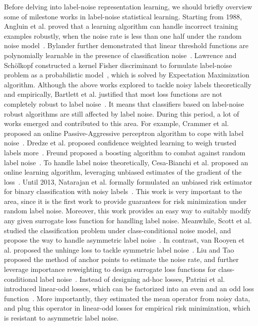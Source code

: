 Before delving into label-noise representation learning, we should briefly overview some of milestone works in label-noise statistical learning. Starting from 1988, Angluin et al. proved that a learning algorithm can handle incorrect training examples robustly, when the noise rate is less than one half under the random noise model~. Bylander further demonstrated that linear threshold functions are polynomially learnable in the presence of classification noise~. Lawrence and Sch\"olkopf constructed a kernel Fisher discriminant to formulate label-noise problem as a probabilistic model~, which is solved by Expectation Maximization algorithm. Although the above works explored to tackle noisy labels theoretically and empirically, Bartlett et al. justified that most loss functions are not completely robust to label noise~. It means that classifiers based on label-noise robust algorithms are still affected by label noise.
During this period, a lot of works emerged and contributed to this area. For example, Crammer et al. proposed an online Passive-Aggressive perceptron algorithm to cope with label noise~. Dredze et al. proposed confidence weighted learning to weigh trusted labels more~. Freund proposed a boosting algorithm to combat against random label noise~. To handle label noise theoretically, Cesa-Bianchi et al. proposed an online learning algorithm, leveraging unbiased estimates of the gradient of the loss~. Until 2013, Natarajan et al. formally formulated an unbiased risk estimator for binary classification with noisy labels~. This work is very important to the area, since it is the first work to provide guarantees for risk minimization under random label noise. Moreover, this work provides an easy way to suitably modify any given surrogate loss function for handling label noise.
Meanwhile, Scott et al. studied the classification problem under class-conditional noise model, and propose the way to handle asymmetric label noise~. In contrast, van Rooyen et al. proposed the unhinge loss to tackle symmetric label noise~. Liu and Tao proposed the method of anchor points to estimate the noise rate, and further leverage importance reweighting to design surrogate loss functions for class-conditional label noise~. Instead of designing ad-hoc losses, Patrini et al. introduced linear-odd losses, which can be factorized into an even and an odd loss function~. More importantly, they estimated the mean operator from noisy data, and plug this operator in linear-odd losses for empirical risk minimization, which is resistant to asymmetric label noise.

